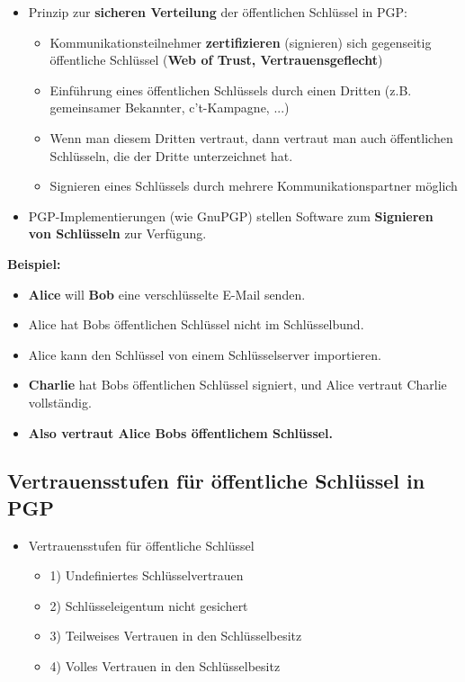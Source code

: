 \documentclass[openany]{book}
\begin{document}
\begin{itemize}
    \item Prinzip zur \textbf{sicheren Verteilung} der öffentlichen Schlüssel in PGP:
    \begin{itemize}
        \item Kommunikationsteilnehmer \textbf{zertifizieren} (signieren) sich gegenseitig öffentliche Schlüssel (\textbf{Web of Trust, Vertrauensgeflecht})
        \item Einführung eines öffentlichen Schlüssels durch einen Dritten (z.B. gemeinsamer Bekannter, c't-Kampagne, ...)
        \item Wenn man diesem Dritten vertraut, dann vertraut man auch öffentlichen Schlüsseln, die der Dritte unterzeichnet hat.
        \item Signieren eines Schlüssels durch mehrere Kommunikationspartner möglich
    \end{itemize}
    \item PGP-Implementierungen (wie GnuPGP) stellen Software zum \textbf{Signieren von Schlüsseln} zur Verfügung. 
\end{itemize}

\textbf{Beispiel:}

\begin{itemize}
    \item \textbf{Alice} will \textbf{Bob} eine verschlüsselte E-Mail senden.
    \item Alice hat Bobs öffentlichen Schlüssel nicht im Schlüsselbund.
    \item Alice kann den Schlüssel von einem Schlüsselserver importieren.
    \item \textbf{Charlie} hat Bobs öffentlichen Schlüssel signiert, und Alice vertraut Charlie vollständig.
    \item \textbf{Also vertraut Alice Bobs öffentlichem Schlüssel.}
\end{itemize}

\subsection{Vertrauensstufen für öffentliche Schlüssel in PGP}

\begin{itemize}
    \item Vertrauensstufen für öffentliche Schlüssel
    \begin{itemize}
        \item 1) Undefiniertes Schlüsselvertrauen
        \item 2) Schlüsseleigentum nicht gesichert
        \item 3) Teilweises Vertrauen in den Schlüsselbesitz
        \item 4) Volles Vertrauen in den Schlüsselbesitz
    \end{itemize}
\end{itemize}
\end{document}
